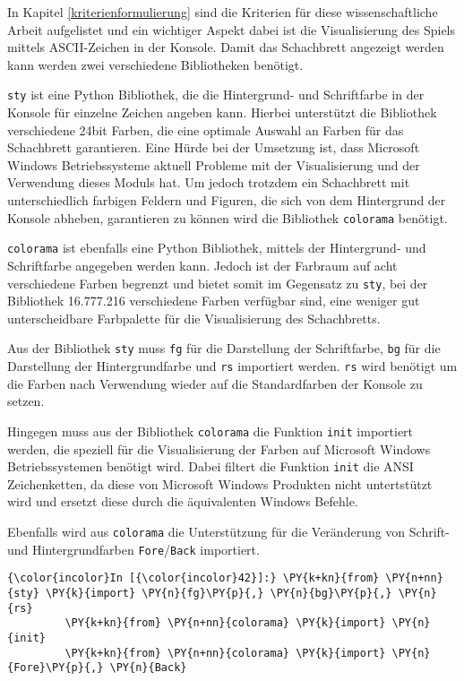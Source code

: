 In Kapitel \ref{kriterienformulierung} sind die Kriterien für diese wissenschaftliche Arbeit
aufgelistet und ein wichtiger Aspekt dabei ist die Visualisierung des
Spiels mittels ASCII-Zeichen in der Konsole. Damit das Schachbrett
angezeigt werden kann werden zwei verschiedene Bibliotheken benötigt.

\texttt{sty} ist eine Python Bibliothek, die die Hintergrund- und
Schriftfarbe in der Konsole für einzelne Zeichen angeben kann. Hierbei
unterstützt die Bibliothek verschiedene 24bit Farben, die eine optimale
Auswahl an Farben für das Schachbrett garantieren. Eine Hürde bei der
Umsetzung ist, dass Microsoft Windows Betriebssysteme aktuell Probleme
mit der Visualisierung und der Verwendung dieses Moduls hat. Um jedoch
trotzdem ein Schachbrett mit unterschiedlich farbigen Feldern und
Figuren, die sich von dem Hintergrund der Konsole abheben, garantieren
zu können wird die Bibliothek \texttt{colorama} benötigt.

\texttt{colorama} ist ebenfalls eine Python Bibliothek, mittels der
Hintergrund- und Schriftfarbe angegeben werden kann. Jedoch ist der
Farbraum auf acht verschiedene Farben begrenzt und bietet somit im
Gegensatz zu \texttt{sty}, bei der Bibliothek 16.777.216 verschiedene
Farben verfügbar sind, eine weniger gut unterscheidbare Farbpalette für
die Visualisierung des Schachbretts.

Aus der Bibliothek \texttt{sty} muss \texttt{fg} für die Darstellung der
Schriftfarbe, \texttt{bg} für die Darstellung der Hintergrundfarbe und
\texttt{rs} importiert werden. \texttt{rs} wird benötigt um die Farben
nach Verwendung wieder auf die Standardfarben der Konsole zu setzen.

Hingegen muss aus der Bibliothek \texttt{colorama} die Funktion
\texttt{init} importiert werden, die speziell für die Visualisierung der
Farben auf Microsoft Windows Betriebssystemen benötigt wird. Dabei
filtert die Funktion \texttt{init} die ANSI Zeichenketten, da diese von
Microsoft Windows Produkten nicht untertstützt wird und ersetzt diese
durch die äquivalenten Windows Befehle.

Ebenfalls wird aus \texttt{colorama} die Unterstützung für die
Veränderung von Schrift- und Hintergrundfarben
\texttt{Fore}/\texttt{Back} importiert.

    \begin{Verbatim}[commandchars=\\\{\}]
{\color{incolor}In [{\color{incolor}42}]:} \PY{k+kn}{from} \PY{n+nn}{sty} \PY{k}{import} \PY{n}{fg}\PY{p}{,} \PY{n}{bg}\PY{p}{,} \PY{n}{rs}
         \PY{k+kn}{from} \PY{n+nn}{colorama} \PY{k}{import} \PY{n}{init}
         \PY{k+kn}{from} \PY{n+nn}{colorama} \PY{k}{import} \PY{n}{Fore}\PY{p}{,} \PY{n}{Back}
\end{Verbatim}

